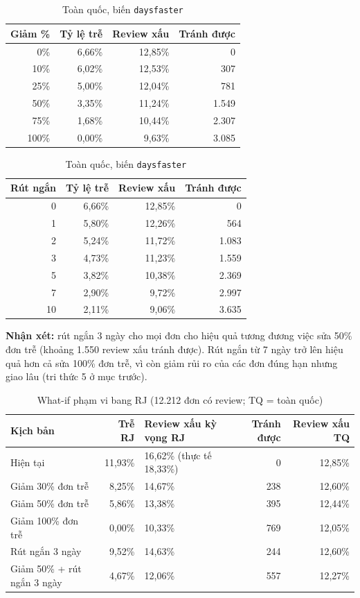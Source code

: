 \documentclass[12pt,a4paper]{report}
\newcommand{\code}[1]{\texttt{#1}}
\renewcommand{\_}{\oldunderscore\allowbreak}
\begin{document}
\begin{table}[H]
\centering\small
\begin{minipage}[t]{0.49\linewidth}\centering
\caption{Toàn quốc, biến \code{late\_reduction}}
\begin{tabular}{rrrr}
\toprule
Giảm \% & Tỷ lệ trễ & Review xấu & Tránh được \\
\midrule
0\% & 6,66\% & 12,85\% & 0 \\
10\% & 6,02\% & 12,53\% & 307 \\
25\% & 5,00\% & 12,04\% & 781 \\
50\% & 3,35\% & 11,24\% & 1.549 \\
75\% & 1,68\% & 10,44\% & 2.307 \\
100\% & 0,00\% & 9,63\% & 3.085 \\
\bottomrule
\end{tabular}
\end{minipage}\hfill
\begin{minipage}[t]{0.49\linewidth}\centering
\caption{Toàn quốc, biến \code{days\_faster}}
\begin{tabular}{rrrr}
\toprule
Rút ngắn & Tỷ lệ trễ & Review xấu & Tránh được \\
\midrule
0 & 6,66\% & 12,85\% & 0 \\
1 & 5,80\% & 12,26\% & 564 \\
2 & 5,24\% & 11,72\% & 1.083 \\
3 & 4,73\% & 11,23\% & 1.559 \\
5 & 3,82\% & 10,38\% & 2.369 \\
7 & 2,90\% & 9,72\% & 2.997 \\
10 & 2,11\% & 9,06\% & 3.635 \\
\bottomrule
\end{tabular}
\end{minipage}
\end{table}

\textbf{Nhận xét:} rút ngắn 3 ngày cho mọi đơn cho hiệu quả tương đương việc sửa 50\% đơn trễ (khoảng 1.550 review xấu tránh được). Rút ngắn từ 7 ngày trở lên hiệu quả hơn cả sửa 100\% đơn trễ, vì còn giảm rủi ro của các đơn đúng hạn nhưng giao lâu (tri thức 5 ở mục trước).

\begin{table}[H]
\centering\small
\caption{What-if phạm vi bang RJ (12.212 đơn có review; TQ = toàn quốc)}
\begin{tabular}{L{4.2cm}rL{3.6cm}rr}
\toprule
Kịch bản & Trễ RJ & Review xấu kỳ vọng RJ & Tránh được & Review xấu TQ \\
\midrule
Hiện tại & 11,93\% & 16,62\% (thực tế 18,33\%) & 0 & 12,85\% \\
Giảm 30\% đơn trễ & 8,25\% & 14,67\% & 238 & 12,60\% \\
Giảm 50\% đơn trễ & 5,86\% & 13,38\% & 395 & 12,44\% \\
Giảm 100\% đơn trễ & 0,00\% & 10,33\% & 769 & 12,05\% \\
Rút ngắn 3 ngày & 9,52\% & 14,63\% & 244 & 12,60\% \\
Giảm 50\% + rút ngắn 3 ngày & 4,67\% & 12,06\% & 557 & 12,27\% \\
\bottomrule
\end{tabular}
\end{table}
\end{document}
